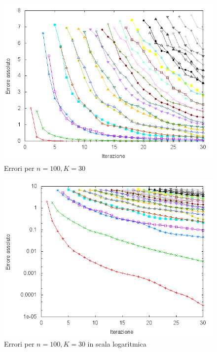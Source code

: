 \documentclass[11pt]{article}
\numberwithin{equation}{subsection}
\begin{document}
\begin{figure}[htb]
\centering
\includegraphics[scale=0.65]{./img/errors_n100K30.png}
\caption{Errori per $n=100, K=30$}
\end{figure}

\begin{figure}[htb]
\centering
\includegraphics[scale=0.65]{./img/errors_n100K30_log.png}
\caption{Errori per $n=100, K=30$ in scala logaritmica}
\end{figure}
\end{document}
